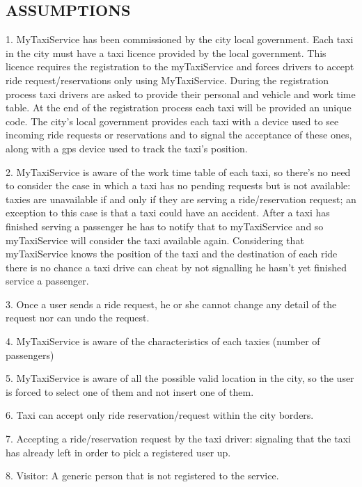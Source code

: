 \documentclass[11pt]{article} %
\begin{document}
    \subsection{ASSUMPTIONS}
      1. MyTaxiService has been commissioned by the city local government.
        Each taxi in the city must have a taxi licence provided by the local government. This licence requires the registration to the myTaxiService
        and forces drivers to accept ride request/reservations only using MyTaxiService.
        During the registration process taxi drivers are asked to provide their personal and vehicle and work time table.
        At the end of the registration process each taxi will be provided an unique code.
        The city's local government provides each taxi with a device used to see incoming ride requests or reservations and
        to signal the acceptance of these ones, along with a gps device used to track the taxi's position.

        2. MyTaxiService is aware of the work time table of each taxi, so there's no need to consider
        the case in which a taxi has no pending requests but is not available: taxies are unavailable
        if and only if they are serving a ride/reservation request; an exception to this case is that a taxi could have an accident.  After a taxi has finished serving a passenger he has to notify that
        to myTaxiService and so myTaxiService will consider the taxi available again. Considering that myTaxiService knows the position
        of the taxi and the destination of each ride there is no chance a taxi drive can cheat by not signalling he hasn't yet finished service a passenger.

        3. Once a user sends a ride request, he or she cannot change any detail of the request nor can
          undo the request.

        4. MyTaxiService is aware of the characteristics of each taxies (number of passengers)

        5. MyTaxiService is aware of all the possible valid location in the city, so the user is forced to select one of them and not insert one of them.

        6. Taxi can accept only ride reservation/request within the city borders.

        7. Accepting a ride/reservation request by the taxi driver: signaling that the taxi has already left in order to pick a registered user up.

        8. Visitor: A generic person that is not registered to the service.
\end{document}
